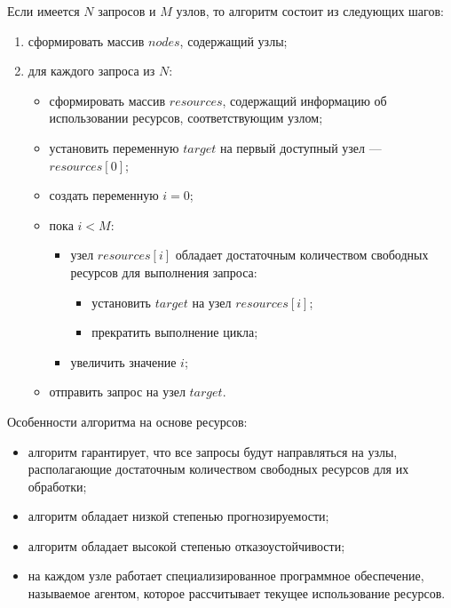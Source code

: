 Если имеется $N$ запросов и $M$ узлов, то алгоритм состоит из следующих шагов:
\begin{enumerate}
	\item сформировать массив $nodes$, содержащий узлы;
	\item для каждого запроса из $N$:
	\begin{itemize}
		\item сформировать массив $resources$, содержащий информацию об использовании ресурсов, соответствующим узлом;
		\item установить переменную $target$ на первый доступный узел --- $resources[0]$;
		\item создать переменную $i = 0$;
		\item пока $i < M$:
		\begin{itemize}
			\item узел $resources[i]$ обладает достаточным количеством свободных ресурсов для выполнения запроса:
			\begin{itemize}
				\item установить $target$ на узел $resources[i]$; 
				\item прекратить выполнение цикла;
			\end{itemize}
			\item увеличить значение $i$;
		\end{itemize}
		\item отправить запрос на узел $target$.
	\end{itemize}
\end{enumerate}

Особенности алгоритма на основе ресурсов:
\begin{itemize}
	\item алгоритм гарантирует, что все запросы будут направляться на узлы, располагающие достаточным количеством свободных ресурсов для их обработки;
    \item алгоритм обладает низкой степенью прогнозируемости;
    \item алгоритм обладает высокой степенью отказоустойчивости;
    \item на каждом узле работает специализированное программное обеспечение, называемое агентом, которое рассчитывает текущее использование ресурсов.
\end{itemize}
